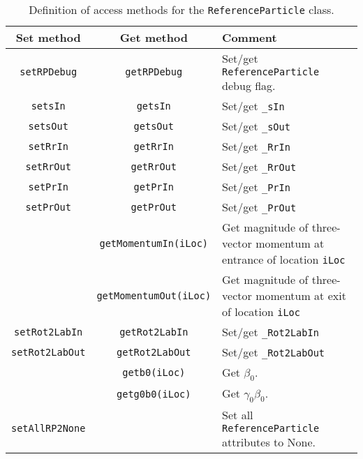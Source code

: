 \begin{table}[h]
  \caption{
    Definition of access methods for the \texttt{ReferenceParticle}
    class. 
  }
  \label{Tab:RP:AccessMethods}
  \begin{center}
    \begin{tabular}{|c|c|p{7cm}|}
      \hline
      \textbf{Set method} & \textbf{Get method}  & \textbf{Comment}                                                      \\
      \hline
      \texttt{setRPDebug}        & \texttt{getRPDebug}        & Set/get \texttt{ReferenceParticle} debug flag.           \\
      \texttt{setsIn}            & \texttt{getsIn}            & Set/get \texttt{\_sIn}                                   \\
      \texttt{setsOut}           & \texttt{getsOut}           & Set/get \texttt{\_sOut}                                  \\
      \texttt{setRrIn}           & \texttt{getRrIn}           & Set/get \texttt{\_RrIn}                                  \\
      \texttt{setRrOut}          & \texttt{getRrOut}          & Set/get \texttt{\_RrOut}                                 \\
      \texttt{setPrIn}           & \texttt{getPrIn}           & Set/get \texttt{\_PrIn}                                  \\
      \texttt{setPrOut}          & \texttt{getPrOut}          & Set/get \texttt{\_PrOut}                                 \\
                                 & \texttt{getMomentumIn(iLoc)}  & Get magnitude of three-vector momentum at entrance of
                                                                   location \texttt{iLoc}                                \\
                                 & \texttt{getMomentumOut(iLoc)} & Get magnitude of three-vector momentum at exit of
                                   location \texttt{iLoc}                                                                \\
      \texttt{setRot2LabIn}      & \texttt{getRot2LabIn}      & Set/get \texttt{\_Rot2LabIn}                             \\
      \texttt{setRot2LabOut}     & \texttt{getRot2LabOut}     & Set/get \texttt{\_Rot2LabOut}                            \\
                                 & \texttt{getb0(iLoc)}       & Get $\beta_0$.                                           \\
                                 & \texttt{getg0b0(iLoc)}     & Get $\gamma_0 \beta_0$.                                  \\
      \texttt{setAllRP2None}     &                            & Set all \texttt{ReferenceParticle} attributes to None.   \\
      \hline
    \end{tabular}
  \end{center}
\end{table}
